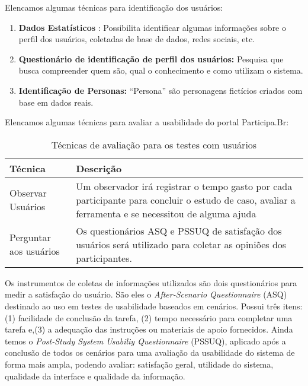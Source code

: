 Elencamos algumas técnicas para identificação dos usuários:

\begin{enumerate}
\item \textbf{Dados Estatísticos} : Possibilita identificar algumas informações sobre o perfil dos usuários, coletadas de base de dados, redes sociais, etc.

\item \textbf{Questionário de identificação de perfil dos usuários:} Pesquisa que busca compreender quem são, qual o conhecimento e como utilizam o sistema. 

\item \textbf{Identificação de Personas:} “Persona” são personagens fictícios criados com base em dados reais.  
\end{enumerate}

Elencamos algumas técnicas para avaliar a usabilidade do portal Participa.Br:

\begin{table}[h]
\begin{tabular}{|l| p{5cm} |}
\hline
Técnica & Descrição \\ \hline
Observar Usuários & Um observador irá registrar o tempo 
gasto por cada participante para concluir o estudo de caso, 
avaliar a ferramenta e se necessitou de alguma ajuda    \\ \hline
Perguntar aos usuários & Os questionários ASQ e PSSUQ 
de satisfação dos usuários será utilizado 
para coletar as opiniões dos participantes.\\ \hline
\end{tabular}
\caption{Técnicas de avaliação para os testes com usuários}
\label{tabela-tecnicas}
\end{table}

Os instrumentos de coletas de informações utilizados são dois questionários para medir a satisfação do usuário.
%
São eles o \textit{After-Scenario Questionnaire} (ASQ) destinado ao uso em testes de usabilidade baseados em cenários. Possui três itens: (1) facilidade de conclusão da tarefa, (2) tempo necessário para completar uma tarefa e,(3) a adequação das instruções ou materiais de apoio fornecidos. Ainda temos o \textit{Post-Study System Usabiliy Questionnaire} (PSSUQ), aplicado após a conclusão de todos os cenários para uma avaliação  da usabilidade do sistema de forma mais ampla, podendo avaliar: satisfação geral, utilidade do sistema, qualidade da interface e qualidade da informação. 

